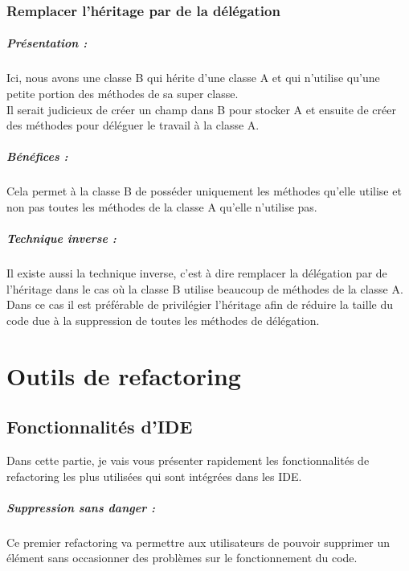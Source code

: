 \documentclass[a4paper,twoside,12pt,openright]{report}
\begin{document}
\newpage

\subsection{Remplacer l'héritage par de la délégation}
\paragraph{Présentation :}
Ici, nous avons une classe B qui hérite d'une classe A et qui n'utilise qu'une petite portion des méthodes de sa super classe.\\
Il serait judicieux de créer un champ dans B pour stocker A et ensuite de créer des méthodes pour déléguer le travail à la classe A.\\

\paragraph{Bénéfices :}
Cela permet à la classe B de posséder uniquement les méthodes qu'elle utilise et non pas toutes les méthodes de la classe A qu'elle n'utilise pas.\\

\paragraph{Technique inverse :}
Il existe aussi la technique inverse, c'est à dire remplacer la délégation par de l'héritage dans le cas où la classe B utilise beaucoup de méthodes de la classe A.
Dans ce cas il est préférable de privilégier l'héritage afin de réduire la taille du code due à la suppression de toutes les méthodes de délégation.\\

\chapter{Outils de refactoring}
\section{Fonctionnalités d'IDE}
Dans cette partie, je vais vous présenter rapidement les fonctionnalités de refactoring les plus utilisées qui sont intégrées dans les IDE.\\

\paragraph{Suppression sans danger :}
Ce premier refactoring va permettre aux utilisateurs de pouvoir supprimer un élément sans occasionner des problèmes sur le fonctionnement du code.\\
\end{document}
